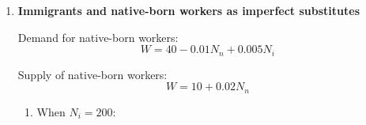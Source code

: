 \documentclass[12pt]{article}
\begin{document}
\begin{enumerate}[label=\textbf{Question \arabic*.}]
Supply:
\[
W=8+0.01N
\]

\begin{enumerate}[label=(\alph*)]
    \item Initial equilibrium: set demand = supply
    \[
    32-0.02N = 8+0.01N
    \]

    \[
    24=0.03N
    \]

    \[
    N=800
    \]

    Substitute into either curve:
    \[
    W=8+0.01(800)=16
    \]

    \[
    \boxed{N=800,\quad W=16}
    \]

    \item New supply:
    \[
    W=8+0.01(N-120)
    \]

    Simplify:
    \[
    W=8+0.01N-1.2=6.8+0.01N
    \]

    New equilibrium:
    \[
    32-0.02N = 6.8+0.01N
    \]

    \[
    25.2 = 0.03N
    \]

    \[
    N=840
    \]

    Wage:
    \[
    W=6.8+0.01(840)=15.2
    \]

    \[
    \boxed{N=840,\quad W=15.2}
    \]

    \item Change in wage:
    \[
    \Delta W=15.2-16=-0.8
    \]

    Change in employment:
    \[
    \Delta N=840-800=40
    \]

    \[
    \boxed{\Delta W=-0.8,\quad \Delta N=40}
    \]

    \item Interpretation:

    Immigration increases labour supply, which lowers the equilibrium wage and raises employment. In this example, the wage falls by \$0.80 and employment rises by 40 workers.
\end{enumerate}


\item \textbf{Immigrants and native-born workers as imperfect substitutes}

Demand for native-born workers:
\[
W=40-0.01N_n+0.005N_i
\]

Supply of native-born workers:
\[
W=10+0.02N_n
\]

\begin{enumerate}[label=(\alph*)]
    \item When \(N_i=200\):


\end{enumerate}
\end{enumerate}
\end{document}
